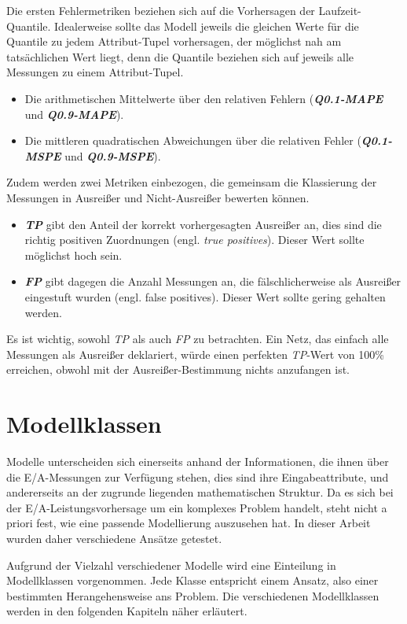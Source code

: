 \documentclass[
	12pt,
	a4paper,
	BCOR10mm,
	DIV14,
	listof=totoc,
	bibliography=totoc,
	headsepline
]{scrreprt}
\begin{document}
Die ersten Fehlermetriken beziehen sich auf die Vorhersagen der Laufzeit-Quantile. Idealerweise sollte das Modell jeweils die gleichen Werte für die Quantile zu jedem Attribut-Tupel vorhersagen, der möglichst nah am tatsächlichen Wert liegt, denn die Quantile beziehen sich auf jeweils alle Messungen zu einem Attribut-Tupel.
\begin{itemize}
	\item Die arithmetischen Mittelwerte über den relativen Fehlern (\textit{\textbf{Q0.1-MAPE}} und \textit{\textbf{Q0.9-MAPE}}).
	\item Die mittleren quadratischen Abweichungen über die relativen Fehler (\textit{\textbf{Q0.1-MSPE}} und \textit{\textbf{Q0.9-MSPE}}).
\end{itemize}
Zudem werden zwei Metriken einbezogen, die gemeinsam die Klassierung der Messungen in Ausreißer und Nicht-Ausreißer bewerten können.
\begin{itemize}
	\item \textit{\textbf{TP}} gibt den Anteil der korrekt vorhergesagten Ausreißer an, dies sind die richtig positiven Zuordnungen (engl. \textit{true positives}). Dieser Wert sollte möglichst hoch sein.
	\item \textit{\textbf{FP}} gibt dagegen die Anzahl Messungen an, die fälschlicherweise als Ausreißer eingestuft wurden (engl. false positives). Dieser Wert sollte gering gehalten werden.
\end{itemize}
Es ist wichtig, sowohl \textit{TP} als auch \textit{FP} zu betrachten. Ein Netz, das einfach alle Messungen als Ausreißer deklariert, würde einen perfekten \textit{TP}-Wert von 100\% erreichen, obwohl mit der Ausreißer-Bestimmung nichts anzufangen ist.

\section{Modellklassen}
\label{analyse:modellklassen}
Modelle unterscheiden sich einerseits anhand der Informationen, die ihnen über die E/A-Messungen zur Verfügung stehen, dies sind ihre Eingabeattribute, und andererseits an der zugrunde liegenden mathematischen Struktur.
Da es sich bei der E/A-Leistungsvorhersage um ein komplexes Problem handelt, steht nicht a priori fest, wie eine passende Modellierung auszusehen hat. 
In dieser Arbeit wurden daher verschiedene Ansätze getestet.

Aufgrund der Vielzahl verschiedener Modelle wird eine Einteilung in Modellklassen vorgenommen. Jede Klasse entspricht einem Ansatz, also einer bestimmten Herangehensweise ans Problem.
Die verschiedenen Modellklassen werden in den folgenden Kapiteln näher erläutert.
\end{document}
